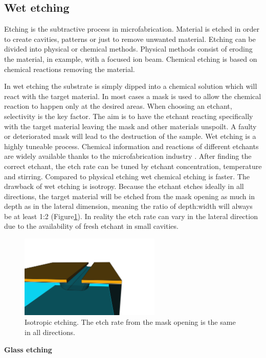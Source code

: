 \documentclass[final]{jyflluk}
\begin{document}
\subsection{Wet etching}
\label{sec:xx4}

Etching is the subtractive process in microfabrication. Material is etched in order to create cavities, patterns or just to remove unwanted material. Etching can be divided into physical or chemical methods. Physical methods consist of eroding the material, in example, with a focused ion beam. Chemical etching is based on chemical reactions removing the material. 

In wet etching the substrate is simply dipped into a chemical solution which will react with the target material. In most cases a mask is used to allow the chemical reaction to happen only at the desired areas. When choosing an etchant, selectivity is the key factor. The aim is to have the etchant reacting specifically with the target material leaving the mask and other materials unspoilt. A faulty or deteriorated mask will lead to the destruction of the sample. 
Wet etching is a highly tuneable process. Chemical information and reactions of different etchants are widely available thanks to the microfabrication industry \cite{williams2003etch}. After finding the correct etchant, the etch rate can be tuned by etchant concentration, temperature and stirring. Compared to physical etching wet chemical etching is faster. The drawback of wet etching is isotropy. Because the etchant etches ideally in all directions, the target material will be etched from the mask opening as much in depth as in the lateral dimension, meaning the ratio of depth:width will always be at least 1:2 (Figure\ref{fig:isotropy}). In reality the etch rate can vary in the lateral direction due to the availability of fresh etchant in small cavities. \cite{lee2010microfabrication}
\begin{figure}[h]
    \centering
    \hspace*{1cm}\includegraphics[width=0.6\textwidth]{images/isotrpy.png}\hspace*{-1cm}
    \caption{Isotropic etching. The etch rate from the mask opening is the same in all directions.}
    \label{fig:isotropy}
\end{figure}
\newline
\newline
\textbf{Glass etching}
\end{document}
